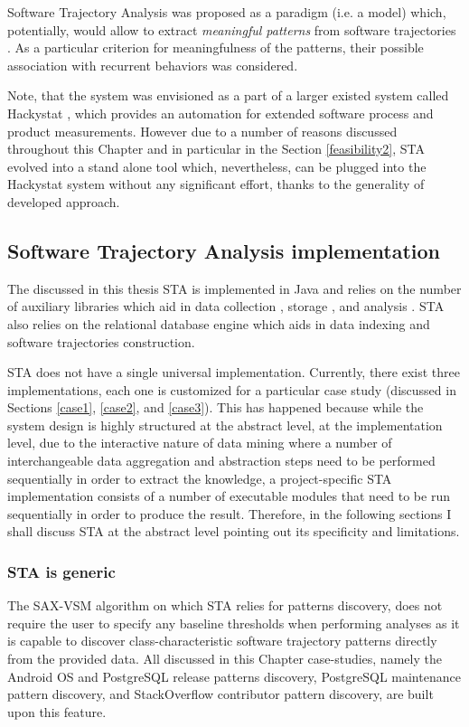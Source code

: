 Software Trajectory Analysis was proposed as a paradigm (i.e. a model) which, potentially, would allow to extract \textit{meaningful patterns} from software trajectories \cite{citeulike:13159603}. As a particular criterion for meaningfulness of the patterns, their possible association with recurrent behaviors was considered. 

Note, that the system was envisioned as a part of a larger existed system called Hackystat \cite{citeulike:12550871}, which provides an automation for extended software process and product measurements. However due to a number of reasons discussed throughout this Chapter and in particular in the Section \ref{feasibility2}, STA evolved into a stand alone tool which, nevertheless, can be plugged into the Hackystat system without any significant effort, thanks to the generality of developed approach.


\subsection{Software Trajectory Analysis implementation}
The discussed in this thesis STA is implemented in Java and relies on the number of auxiliary libraries which aid in data collection \cite{jgit}, storage \cite{mybatis}, and analysis \cite{sax-vsm}. STA also relies on the relational database engine which aids in data indexing and software trajectories construction. 

STA does not have a single universal implementation. Currently, there exist three implementations, each one is customized for a particular case study (discussed in Sections \ref{case1}, \ref{case2}, and \ref{case3}). This has happened because while the system design is highly structured at the abstract level, at the implementation level, due to the interactive nature of data mining where a number of interchangeable data aggregation and abstraction steps need to be performed sequentially in order to extract the knowledge, a project-specific STA implementation consists of a number of executable modules that need to be run sequentially in order to produce the result. Therefore, in the following sections I shall discuss STA at the abstract level pointing out its specificity and limitations.

\subsubsection{STA is generic}
The \mbox{SAX-VSM} algorithm on which STA relies for patterns discovery, does not require the user to specify any baseline thresholds when performing analyses as it is capable to discover class-characteristic software trajectory patterns directly from the provided data. All discussed in this Chapter case-studies, namely the Android OS and PostgreSQL release patterns discovery,  PostgreSQL maintenance pattern discovery, and StackOverflow contributor pattern discovery, are built upon this feature.

